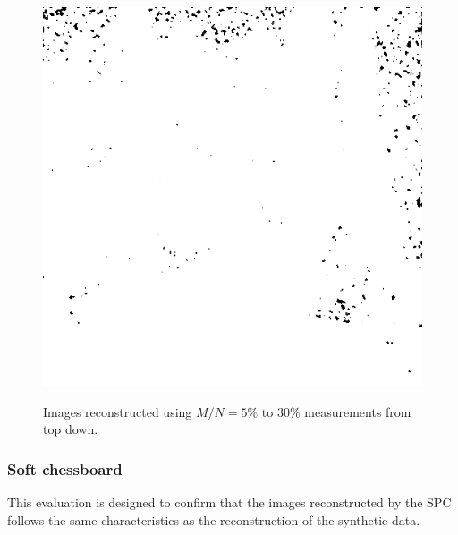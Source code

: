 \begin{figure}[H]
\begin{minipage}[t]{0.3\linewidth}
	\label{fig:hus_m30}
\end{minipage}
\begin{minipage}[t]{0.3\linewidth} %
	\includegraphics[width = 1\linewidth]{gfx/sit/sit_m30.png}
	\label{fig:sit_m30}
\end{minipage}
	\caption{Images reconstructed using $M/N = 5\% \text{ to } 30\%$ measurements from top down.} 
\end{figure}

\subsubsection{Soft chessboard}
This evaluation is designed to confirm that the images reconstructed by the SPC follows the same characteristics as the reconstruction of the synthetic data.



